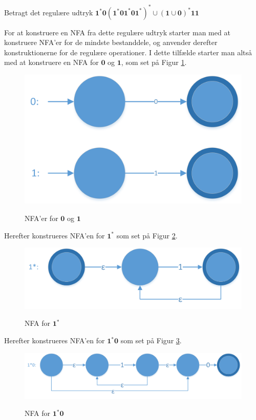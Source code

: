 \documentclass[a4paper,10pt,article]{memoir}
\begin{document}
\begin{eksempel}
Betragt det regulære udtryk $\mathbf{1^*0(1^*01^*01^*)^*  \cup (1 \cup 0)^*11}$

For at konstruere en NFA fra dette regulære udtryk starter man med at
konstruere NFA'er for de mindste bestanddele, og anvender derefter
konstruktionerne for de regulære operationer. I dette tilfælde starter
man altså med at konstruere en NFA for $\mathbf{0}$ og $\mathbf{1}$, som set på Figur
\ref{fig:fig4}.

\begin{figure}[H]%
{\centering 
\includegraphics[width=\textwidth]{Fig4x.png}
}
\caption{NFA'er for $\mathbf{0}$ og $\mathbf{1}$}
\label{fig:fig4}
\end{figure}

Herefter konstrueres NFA'en for $\mathbf{1^*}$ som set på Figur \ref{fig:fig5}. 

\begin{figure}[H]%
{\centering 
\includegraphics[width=\textwidth]{Fig5x.png}
} \caption{NFA for $\mathbf{1^*}$}
\label{fig:fig5}
\end{figure}

Herefter konstrueres NFA'en for $\mathbf{1^*0}$ som set på Figur \ref{fig:fig6}. 

\begin{figure}[H]%
{\centering 
\includegraphics[width=\textwidth]{Fig6x.png}
} \caption{NFA for $\mathbf{1^*0}$}
\label{fig:fig6}
\end{figure}


\end{eksempel}
\end{document}
